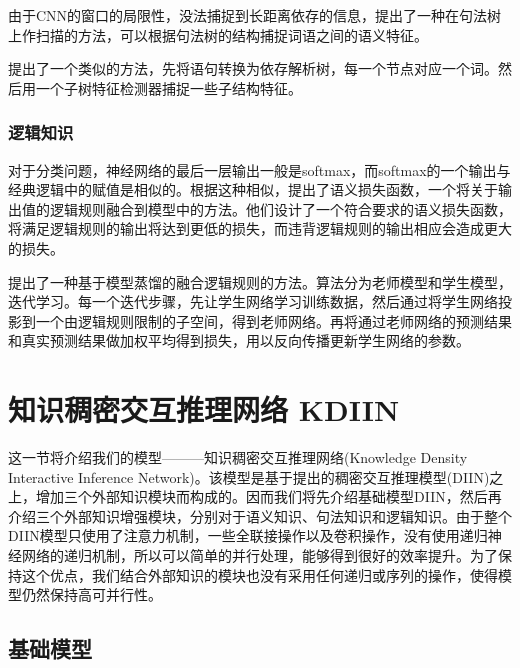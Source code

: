 \documentclass[UTF8,11pt,a4paper,nofonts]{ctexart}
\begin{document}
由于CNN的窗口的局限性，没法捕捉到长距离依存的信息，\cite{Ma2015DependencybasedCN}提出了一种在句法树上作扫描的方法，可以根据句法树的结构捕捉词语之间的语义特征。

\cite{Mou2016NaturalLI}提出了一个类似的方法，先将语句转换为依存解析树，每一个节点对应一个词。然后用一个子树特征检测器捕捉一些子结构特征。

\subsubsection{逻辑知识}

对于分类问题，神经网络的最后一层输出一般是softmax，而softmax的一个输出与经典逻辑中的赋值是相似的。根据这种相似，\cite{Xu2017ASL}提出了语义损失函数，一个将关于输出值的逻辑规则融合到模型中的方法。他们设计了一个符合要求的语义损失函数，将满足逻辑规则的输出将达到更低的损失，而违背逻辑规则的输出相应会造成更大的损失。

\cite{Hu2016HarnessingDN, Hu2016DeepNN}提出了一种基于模型蒸馏的融合逻辑规则的方法。算法分为老师模型和学生模型，迭代学习。每一个迭代步骤，先让学生网络学习训练数据，然后通过将学生网络投影到一个由逻辑规则限制的子空间，得到老师网络。再将通过老师网络的预测结果和真实预测结果做加权平均得到损失，用以反向传播更新学生网络的参数。





\newpage
\section{知识稠密交互推理网络 KDIIN}

这一节将介绍我们的模型———知识稠密交互推理网络(Knowledge Density Interactive Inference Network)。该模型是基于\cite{yichen2018nli}提出的稠密交互推理模型(DIIN)之上，增加三个外部知识模块而构成的。因而我们将先介绍基础模型DIIN，然后再介绍三个外部知识增强模块，分别对于语义知识、句法知识和逻辑知识。由于整个DIIN模型只使用了注意力机制，一些全联接操作以及卷积操作，没有使用递归神经网络的递归机制，所以可以简单的并行处理，能够得到很好的效率提升。为了保持这个优点，我们结合外部知识的模块也没有采用任何递归或序列的操作，使得模型仍然保持高可并行性。

\subsection{基础模型}
\end{document}

